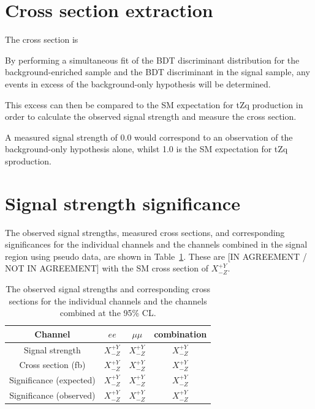 \section{Cross section extraction}
The cross section is 


By performing a simultaneous fit of the BDT discriminant distribution for the background-enriched sample and the BDT discriminant in the signal sample, any events in excess of the background-only hypothesis will be determined.

This excess can then be compared to the SM expectation for tZq production in order to calculate the observed signal strength and measure the cross section.

A measured signal strength of 0.0 would correspond to an observation of the background-only hypothesis alone, whilst 1.0 is the SM expectation for tZq sproduction.

\section{Signal strength significance}
The observed signal strengths, measured cross sections, and corresponding significances for the individual channels and the channels combined in the signal region using pseudo data, are shown in Table~\ref{tab:shapetxs}. 
These are [IN AGREEMENT / NOT IN AGREEMENT] with the SM cross section of  $X^{+Y}_{-Z}$.
 
\begin{table}[!h]
   \centering
   \caption{The observed signal strengths and corresponding cross sections for
   the individual channels and the channels combined at the 95\% CL.}
   \begin{tabular}{cccc}
       \hline
       Channel & $ee$ & $\mu\mu$ & \textbf{combination} \\
        \hline
        Signal strength & $X_{-Z}^{+Y}$ & $X_{-Z}^{+Y}$ & $X_{-Z}^{+Y}$ \\
       Cross section (fb) & $X_{-Z}^{+Y}$ & $X_{-Z}^{+Y}$ & $X_{-Z}^{+Y}$ \\
       Significance (expected) & $X_{-Z}^{+Y}$ & $X_{-Z}^{+Y}$ & $X_{-Z}^{+Y}$ \\
       Significance (observed) & $X_{-Z}^{+Y}$ & $X_{-Z}^{+Y}$ & $X_{-Z}^{+Y}$ \\
        \hline
    \end{tabular}
   \label{tab:shapetxs}
\end{table}


